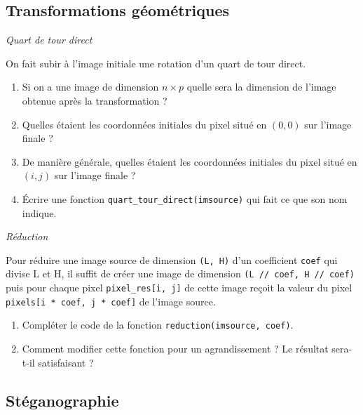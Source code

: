\documentclass[10pt,a4paper,pdftex]{book}
\begin{document}
\subsection{Transformations géométriques}

\begin{exoc}{\textit{Quart de tour direct}}

On fait subir à l'image initiale une rotation d'un quart de tour direct.
	\begin{enumerate}
	\item Si on a une image de dimension $n\times p$ quelle sera la dimension de l'image obtenue après la transformation ?
	\item Quelles étaient les coordonnées initiales du pixel situé en $(0,0)$ sur l'image finale ?
	\item De manière générale, quelles étaient les coordonnées initiales du pixel situé en $(i,j)$ sur l'image finale ?
	\item Écrire une fonction \verb!quart_tour_direct(imsource)! qui fait ce que son nom indique.
	\end{enumerate}
\end{exoc}

\begin{exoc}{\textit{Réduction}}

Pour réduire une image source  de dimension \texttt{(L, H)}  d'un coefficient \texttt{coef} qui divise L et H, il suffit de créer une image de dimension \texttt{(L // coef, H // coef)} puis pour chaque pixel \texttt{pixel\_res[i, j]} de cette image reçoit la valeur du pixel \texttt{pixels[i * coef, j * coef]} de l'image source.

\begin{enumerate}
\item Compléter le code de la fonction \verb+reduction(imsource, coef)+. 

\item Comment modifier cette fonction pour un agrandissement ? Le résultat sera-t-il satisfaisant ?
\end{enumerate}
\end{exoc}


\subsection{Stéganographie}
\end{document}
